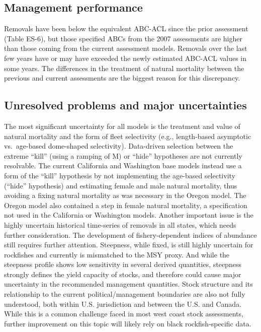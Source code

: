 \documentclass[11pt,
  english,
  letterpaper,
]{article}
\begin{document}
\hypertarget{management-performance}{%
\subsection*{Management performance}\label{management-performance}}

Removals have been below the equivalent ABC-ACL since the prior assessment (Table ES-6), but those specified ABCs from the 2007 assessments are higher than those coming from the current assessment models. Removals over the last few years have or may have exceeded the newly estimated ABC-ACL values in some years. The differences in the treatment of natural mortality between the previous and current assessments are the biggest reason for this discrepancy.

\hypertarget{unresolved-problems-and-major-uncertainties}{%
\subsection*{Unresolved problems and major uncertainties}\label{unresolved-problems-and-major-uncertainties}}

The most significant uncertainty for all models is the treatment and value of natural mortality and the form of fleet selectivity (e.g., length-based asymptotic vs.~age-based dome-shaped selectivity). Data-driven selection between the extreme ``kill'' (using a ramping of M) or ``hide'' hypotheses are not currently resolvable. The current California and Washington base models instead use a form of the ``kill'' hypothesis by not implementing the age-based selectivity (``hide'' hypothesis) and estimating female and male natural mortality, thus avoiding a fixing natural mortality as was necessary in the Oregon model. The Oregon model also contained a step in female natural mortality, a specification not used in the California or Washington models. Another important issue is the highly uncertain historical time-series of removals in all states, which needs further consideration. The development of fishery-dependent indices of abundance still requires further attention. Steepness, while fixed, is still highly uncertain for rockfishes and currently is mismatched to the MSY proxy. And while the steepness profile shows low sensitivity in several derived quantities, steepness strongly defines the yield capacity of stocks, and therefore could cause major uncertainty in the recommended management quantities. Stock structure and its relationship to the current political/management boundaries are also not fully understood, both within U.S. jurisdiction and between the U.S. and Canada. While this is a common challenge faced in most west coast stock assessments, further improvement on this topic will likely rely on black rockfish-specific data.
\end{document}
